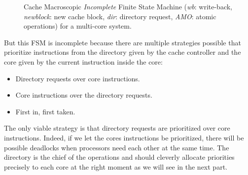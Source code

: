 \documentclass[10pt,letterpaper]{article}
\begin{document}
\begin{figure}[H] 
\centering 
{}
\caption{Cache Macroscopic \textit{Incomplete} Finite State Machine (\textit{wb}: write-back, \textit{newblock}: new cache block, \textit{dir}: directory request, \textit{AMO}: atomic operations) for a multi-core system.}
\label{fig:cachemultiFSM}
\end{figure}

\noindent But this FSM is incomplete because there are multiple strategies possible that prioritize instructions from the directory given by the cache controller and the core given by the current instruction inside the core:

\begin{itemize}
    \item Directory requests over core instructions.
    \item Core instructions over the directory requests.
    \item First in, first taken.
\end{itemize}

\noindent The only viable strategy is that directory requests are prioritized over core instructions. Indeed, if we let the cores instructions be prioritized, there will be possible deadlocks when processors need each other at the same time. The directory is the chief of the operations and should cleverly allocate priorities precisely to each core at the right moment as we will see in the next part.\\
\end{document}
